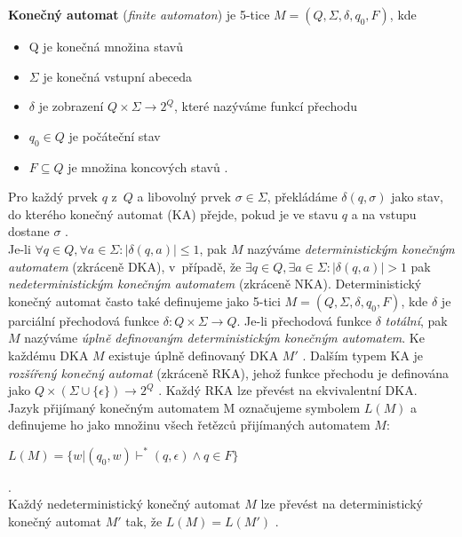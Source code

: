 \textbf{Konečný automat} (\textit{finite automaton}) je 5-tice $M = (Q, \Sigma, \delta, q_0, F)$, kde
\begin{itemize}
\item Q je konečná množina stavů
\item $\Sigma$ je konečná vstupní abeceda
\item $\delta$ je zobrazení $Q \times \Sigma \rightarrow 2^Q$, které nazýváme funkcí přechodu
\item $q_0 \in Q$ je počáteční stav
\item $F \subseteq Q$ je množina koncových stavů \cite[str. 21]{TIN2013}.
\end{itemize}
\vspace*{\baselineskip}
Pro každý prvek $q$ z~$Q$ a libovolný prvek $\sigma \in \Sigma$, překládáme $\delta(q, \sigma)$
jako stav, do kterého \mbox{konečný} automat (KA) přejde, pokud je ve stavu $q$ a na vstupu dostane $\sigma$ \cite[str. 52]{Martin2011}. \\

Je-li $\forall q \in Q, \forall a \in \Sigma: |\delta(q, a)| \leq 1$, pak $M$ nazýváme \textit{deterministickým konečným automatem} 
(zkráceně DKA), v~případě, že $\exists q \in Q, \exists a \in \Sigma:  |\delta(q, a)| >1$ pak \textit{nedeterministickým konečným automatem} 
(zkráceně NKA). Deterministický konečný automat často také definujeme jako 5-tici $M = (Q, \Sigma, \delta, q_0, F)$, kde $\delta$ je parciální 
přechodová funkce $\delta: Q \times \Sigma \rightarrow Q$. 
Je-li přechodová funkce $\delta$ \textit{totální}, pak $M$ nazýváme \textit{úplně definovaným deterministickým konečným automatem}. Ke každému 
DKA $M$ existuje  úplně definovaný DKA $M'$ \cite[str. 21]{TIN2013}.
Dalším typem KA je \textit{rozšířený konečný automat} (zkráceně RKA), jehož funkce přechodu je definována jako 
$Q \times (\Sigma \cup \{\epsilon\}) \rightarrow 2^Q$ \cite[str. 43]{TIN2013}. Každý RKA lze převést na ekvivalentní DKA.\\

Jazyk přijímaný konečným automatem M označujeme symbolem $L(M)$ a definujeme ho jako množinu všech řetězců přijímaných automatem $M$:
\begin{center}
$L(M) = \{w | (q_0, w) \vdash^* (q, \epsilon) \wedge q \in F\}$
\end{center}
\cite[str. 22]{TIN2013}. \\

Každý nedeterministický konečný automat $M$ lze převést na deterministický konečný \mbox{automat} $M'$ tak, že 
$L(M) = L(M')$ \cite[str. 23]{TIN2013}. \\

